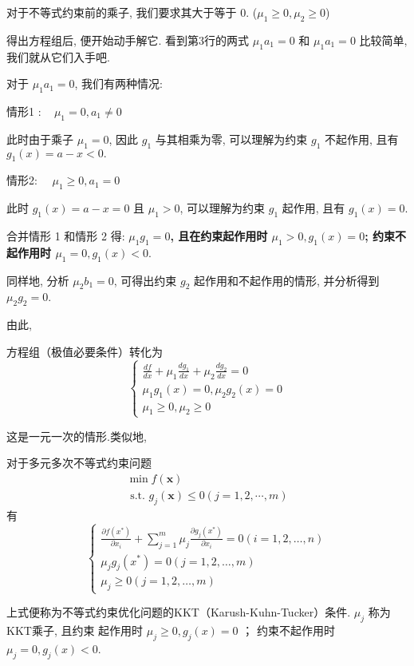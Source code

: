 \begin{remark}
    对于不等式约束前的乘子, 我们要求其大于等于 0. ($\mu_{1} \geq 0, \mu_{2} \geq 0$)
\end{remark}

得出方程组后, 便开始动手解它. 看到第3行的两式 $\mu_{1} a_{1}=0$ 和 $\mu_{1} a_{1}=0$ 比较简单, 我们就从它们入手吧.

对于 $\mu_{1} a_{1}=0$, 我们有两种情况:

情形1 $: \quad \mu_{1}=0, a_{1} \neq 0$

此时由于乘子 $\mu_{1}=0$, 因此 $g_{1}$ 与其相乘为零, 可以理解为约束 $g_{1}$ 不起作用, 且有 $g_{1}(x)=a-x<0 .$

情形2: $\quad \mu_{1} \geq 0, a_{1}=0$

此时 $g_{1}(x)=a-x=0$ 且 $\mu_{1}>0$, 可以理解为约束 $g_{1}$ 起作用, 且有 $g_{1}(x)=0$.

合并情形 1 和情形 2 得: \textbf{$\mu_{1} g_{1}=0$, 且在约束起作用时 $\mu_{1}>0, g_{1}(x)=0$; 约束不起作用时 $\mu_{1}=0, g_{1}(x)<0 .$}

同样地, 分析 $\mu_{2} b_{1}=0$, 可得出约束 $g_{2}$ 起作用和不起作用的情形, 并分析得到 $\mu_{2} g_{2}=0$.

由此, 
\begin{theorem}[一元一次优化式的KKT条件]
    方程组（极值必要条件）转化为
$$
\left\{\begin{array}{l}
\frac{d f}{d x}+\mu_{1} \frac{d g_{1}}{d x}+\mu_{2} \frac{d g_{2}}{d x}=0 \\
\mu_{1} g_{1}(x)=0, \mu_{2} g_{2}(x)=0 \\
\mu_{1} \geq 0, \mu_{2} \geq 0
\end{array}\right.
$$

\end{theorem}

 这是一元一次的情形.类似地, 

\begin{corollary}
    对于多元多次不等式约束问题
$$
\begin{array}{l}
\min f(\mathbf{x}) \\
\text { s.t. } g_{j}(\mathbf{x}) \leq 0(j=1,2, \cdots, m)
\end{array}
$$
有
$$
\left\{\begin{array}{l}
\frac{\partial f\left(x^{*}\right)}{\partial x_{i}}+\sum_{j=1}^{m} \mu_{j} \frac{\partial g_{j}\left(x^{*}\right)}{\partial x_{i}}=0(i=1,2, \ldots, n) \\
\mu_{j} g_{j}\left(x^{*}\right)=0(j=1,2, \ldots, m) \\
\mu_{j} \geq 0(j=1,2, \ldots, m)
\end{array}\right.
$$

上式便称为不等式约束优化问题的KKT（Karush-Kuhn-Tucker）条件. $ \mu_{j} $ 称为KKT乘子, 且约束 起作用时 $ \mu_{j} \geq 0, g_{j}(x)=0 $ ； 约束不起作用时 $ \mu_{j}=0, g_{j}(x)<0 $.
\end{corollary}

